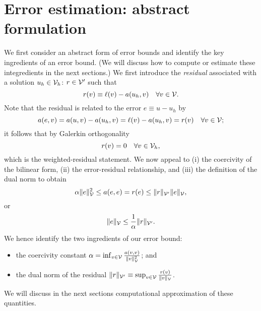 \section{Error estimation: abstract formulation}
We first consider an abstract form of error bounds and identify the key ingredients of an error bound. (We will discuss how to compute or estimate these integredients in the next sections.) %
We first introduce the \emph{residual} associated with a solution $u_h \in \mathcal{V}_h$: $r \in \mathcal{V}'$ such that
\begin{equation*}
  r(v) \equiv \ell(v) - a(u_h,v) \quad \forall v \in \mathcal{V}.
\end{equation*}
Note that the residual is related to the error $e \equiv u - u_h$ by
\begin{equation*}
  a(e,v) = a(u,v) - a(u_h,v) = \ell(v) - a(u_h,v) =  r(v) \quad \forall v \in \mathcal{V};
\end{equation*}
it follows that by Galerkin orthogonality
\begin{equation*}
  r(v) = 0 \quad  \forall v \in \mathcal{V}_h,
\end{equation*}
which is the weighted-residual statement.  We now appeal to (i) the coercivity of the bilinear form, (ii) the error-residual relationship, and (iii) the definition of the dual norm to obtain
\begin{equation*}
  \alpha \| e \|_{\mathcal{V}}^2 \leq a(e,e) = r(e) \leq \| r \|_{\mathcal{V}'} \| e \|_{\mathcal{V}},
\end{equation*}
or
\begin{equation}
  \| e \|_{\mathcal{V}} \leq \frac{1}{\alpha} \| r \|_{\mathcal{V}'}.
  \label{eq:adapt_err_bnd}
\end{equation}
We hence identify the two ingredients of our error bound:
\begin{itemize}
\item the coercivity constant $\alpha = \inf_{v \in \mathcal{V}} \frac{a(v,v)}{ \| v \|^2_{\mathcal{V}}}$;  and
\item the dual norm of the residual $\| r \|_{\mathcal{V}'} \equiv \sup_{v \in \mathcal{V}} \frac{ r(v) }{ \| v \|_{\mathcal{V}}}$.
\end{itemize}
We will discuss in the next sections computational approximation of these quantities.

